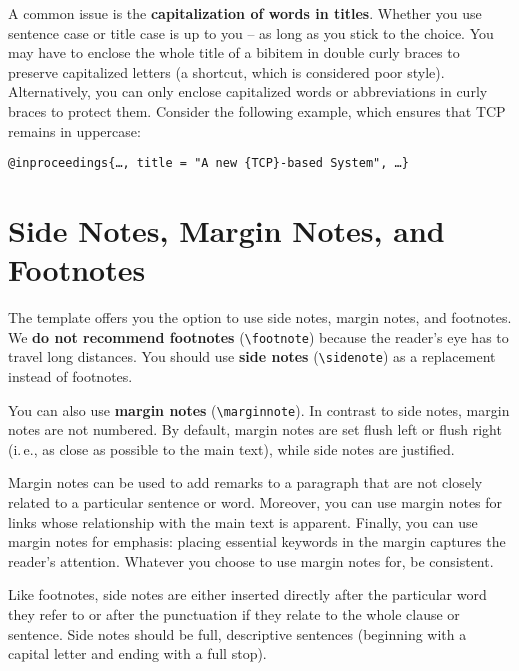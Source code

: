 A common issue is the \textbf{capitalization of words in titles}.
Whether you use sentence case or title case is up to you -- as long as you stick to the choice. You may have to enclose the whole title of a bibitem in double curly braces to preserve capitalized letters (a shortcut, which is considered poor style). Alternatively, you can only enclose capitalized words or abbreviations in curly braces to protect them.%
Consider the following example, which ensures that TCP remains in uppercase:
\begin{verbatim}
@inproceedings{…, title = "A new {TCP}-based System", …}
\end{verbatim} 

\section{Side Notes, Margin Notes, and Footnotes}

The template offers you the option to use side notes, margin notes, and footnotes. We \textbf{do not recommend footnotes} (\verb|\footnote|) because the reader's eye has to travel long distances. You should use \textbf{side notes} (\verb|\sidenote|) as a replacement instead of footnotes.

You can also use \textbf{margin notes} (\verb|\marginnote|). In contrast to side notes, margin notes are not numbered. By default, margin notes are set flush left or flush right (i.\,e., as close as possible to the main text), while side notes are justified.

Margin notes can be used to add remarks to a paragraph that are not closely related to a particular sentence or word. Moreover, you can use margin notes for links whose relationship with the main text is apparent. Finally, you can use margin notes for emphasis: placing essential keywords in the margin captures the reader's attention. Whatever you choose to use margin notes for, be consistent.

Like footnotes, side notes are either inserted directly after the particular word they refer to or after the punctuation if they relate to the whole clause or sentence. Side notes should be full, descriptive sentences (beginning with a capital letter and ending with a full stop).

